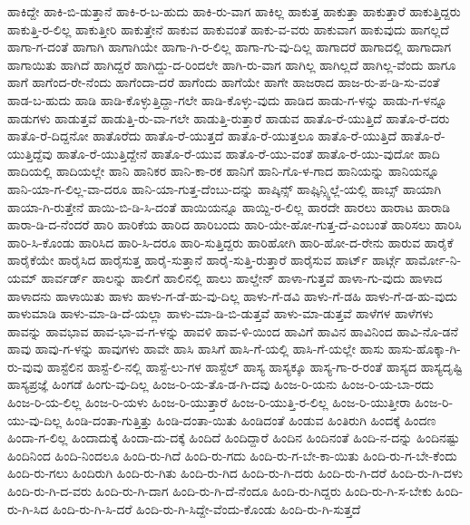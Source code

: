 {ಹಾಕಿದ್ದೇ
ಹಾಕಿ-ಬಿ-ಡುತ್ತಾನೆ
ಹಾಕಿ-ರ-ಬ-ಹುದು
ಹಾಕಿ-ರು-ವಾಗ
ಹಾಕಿಲ್ಲ
ಹಾಕುತ್ತ
ಹಾಕುತ್ತಾ
ಹಾಕುತ್ತಾರೆ
ಹಾಕುತ್ತಿದ್ದರು
ಹಾಕುತ್ತಿ-ರ-ಲಿಲ್ಲ
ಹಾಕುತ್ತೀರಿ
ಹಾಕುತ್ತೇನೆ
ಹಾಕುವ
ಹಾಕುವಂತೆ
ಹಾಕು-ವ-ವರು
ಹಾಕುವಾಗ
ಹಾಕುವುದು
ಹಾಗಲ್ಲದೆ
ಹಾಗಾ-ಗ-ದಂತೆ
ಹಾಗಾಗಿ
ಹಾಗಾಗಿಯೇ
ಹಾಗಾ-ಗಿ-ರ-ಲಿಲ್ಲ
ಹಾಗಾ-ಗು-ವು-ದಿಲ್ಲ
ಹಾಗಾದರೆ
ಹಾಗಾದಲ್ಲಿ
ಹಾಗಾದಾಗ
ಹಾಗಾಯಿತು
ಹಾಗಿದೆ
ಹಾಗಿದ್ದರೆ
ಹಾಗಿದ್ದು-ದ-ರಿಂದಲೇ
ಹಾಗಿ-ರು-ವಾಗ
ಹಾಗಿಲ್ಲ
ಹಾಗಿಲ್ಲದೆ
ಹಾಗಿಲ್ಲ-ವೆಂದು
ಹಾಗೂ
ಹಾಗೆ
ಹಾಗೆಂದ-ರೇ-ನೆಂದು
ಹಾಗೆಂದಾ-ದರೆ
ಹಾಗೆಂದು
ಹಾಗೆಯೇ
ಹಾಗೇ
ಹಾಜರಾದ
ಹಾಜ-ರು-ಪ-ಡಿ-ಸು-ವಂತೆ
ಹಾಡ-ಬ-ಹುದು
ಹಾಡಿ
ಹಾಡಿ-ಕೊಳ್ಳುತ್ತಿದ್ದಾ-ಗಲೇ
ಹಾಡಿ-ಕೊಳ್ಳು-ವುದು
ಹಾಡಿದ
ಹಾಡು-ಗ-ಳನ್ನು
ಹಾಡು-ಗ-ಳನ್ನೂ
ಹಾಡುಗಳು
ಹಾಡುತ್ತವೆ
ಹಾಡುತ್ತಿ-ರು-ವಾ-ಗಲೇ
ಹಾಡುತ್ತಿ-ರುತ್ತಾರೆ
ಹಾಡುವ
ಹಾತೊ-ರೆ-ಯುತ್ತಿದೆ
ಹಾತೊ-ರೆ-ದರು
ಹಾತೊ-ರೆ-ದಿದ್ದನೋ
ಹಾತೊರೆದು
ಹಾತೊ-ರೆ-ಯುತ್ತದೆ
ಹಾತೊ-ರೆ-ಯುತ್ತಲೂ
ಹಾತೊ-ರೆ-ಯುತ್ತಿದೆ
ಹಾತೊ-ರೆ-ಯುತ್ತಿದ್ದೆವು
ಹಾತೊ-ರೆ-ಯುತ್ತಿದ್ದೇನೆ
ಹಾತೊ-ರೆ-ಯುವ
ಹಾತೊ-ರೆ-ಯು-ವಂತೆ
ಹಾತೊ-ರೆ-ಯು-ವುದೋ
ಹಾದಿ
ಹಾದಿಯಲ್ಲಿ
ಹಾದಿಯಲ್ಲೇ
ಹಾನಿ
ಹಾನಿಕರ
ಹಾನಿ-ಕಾ-ರಕ
ಹಾನಿಗೆ
ಹಾನಿ-ಗೊ-ಳ-ಗಾದ
ಹಾನಿಯನ್ನು
ಹಾನಿಯನ್ನೂ
ಹಾನಿ-ಯಾ-ಗ-ಲಿಲ್ಲ-ವಾ-ದರೂ
ಹಾನಿ-ಯಾ-ಗುತ್ತ-ದೆಂಬು-ದನ್ನು
ಹಾಪ್ಕಿನ್ಸ್
ಹಾಫ್ಕಿನ್ಸ್ವಿಲ್ಲೆ-ಯಲ್ಲಿ
ಹಾಬ್ಸ್
ಹಾಯಾಗಿ
ಹಾಯಾ-ಗಿ-ರುತ್ತೇನೆ
ಹಾಯಿ-ಬಿ-ಡಿ-ಸಿ-ದಂತೆ
ಹಾಯಿಯನ್ನೂ
ಹಾಯ್ದಿ-ರ-ಲಿಲ್ಲ
ಹಾರದೇ
ಹಾರಲು
ಹಾರಾಟ
ಹಾರಾಡಿ
ಹಾರಾ-ಡಿ-ದ-ನೆಂದರೆ
ಹಾರಿ
ಹಾರಿಕೆಯ
ಹಾರಿದ
ಹಾರಿಬಂದು
ಹಾರಿ-ಯೇ-ಹೋ-ಗುತ್ತ-ದೆ-ಎಂಬಂತೆ
ಹಾರಿಸಲು
ಹಾರಿಸಿ
ಹಾರಿ-ಸಿ-ಕೊಂಡು
ಹಾರಿಸಿದ
ಹಾರಿ-ಸಿ-ದರೂ
ಹಾರಿ-ಸುತ್ತಿದ್ದರು
ಹಾರಿಹೋಗಿ
ಹಾರಿ-ಹೋ-ದ-ರೇನು
ಹಾರುವ
ಹಾರೈಕೆ
ಹಾರೈಕೆಯೇ
ಹಾರೈಸಿದ
ಹಾರೈಸುತ್ತ
ಹಾರೈ-ಸುತ್ತಾನೆ
ಹಾರೈ-ಸುತ್ತಿ-ರುತ್ತಾರೆ
ಹಾರೈಸುವ
ಹಾರ್ಟ್
ಹಾರ್ಟ್ಗೆ
ಹಾರ್ಮೋ-ನಿ-ಯಮ್
ಹಾರ್ವರ್ಡ್
ಹಾಲನ್ನು
ಹಾಲಿಗೆ
ಹಾಲಿನಲ್ಲಿ
ಹಾಲು
ಹಾಲ್ಡೇನ್
ಹಾಳಾ-ಗುತ್ತವೆ
ಹಾಳಾ-ಗು-ವುದು
ಹಾಳಾದ
ಹಾಳಾದನು
ಹಾಳಾಯಿತು
ಹಾಳು
ಹಾಳು-ಗ-ಡೆ-ಹು-ವು-ದಿಲ್ಲ
ಹಾಳು-ಗೆ-ಡವಿ
ಹಾಳು-ಗೆ-ಡಹಿ
ಹಾಳು-ಗೆ-ಡ-ಹು-ವುದು
ಹಾಳುಮಾಡಿ
ಹಾಳು-ಮಾ-ಡಿ-ದೆ-ಯಲ್ಲಾ
ಹಾಳು-ಮಾ-ಡಿ-ಬಿ-ಡುತ್ತವೆ
ಹಾಳು-ಮಾ-ಡುತ್ತವೆ
ಹಾಳೆಗಳ
ಹಾಳೆಗಳು
ಹಾವನ್ನು
ಹಾವಭಾವ
ಹಾವ-ಭಾ-ವ-ಗ-ಳನ್ನು
ಹಾವಳಿ
ಹಾವ-ಳಿ-ಯಿಂದ
ಹಾವಿಗೆ
ಹಾವಿನ
ಹಾವಿನಿಂದ
ಹಾವಿ-ನೊ-ಡನೆ
ಹಾವು
ಹಾವು-ಗ-ಳನ್ನು
ಹಾವುಗಳು
ಹಾವೇ
ಹಾಸಿ
ಹಾಸಿಗೆ
ಹಾಸಿ-ಗೆ-ಯಲ್ಲಿ
ಹಾಸಿ-ಗೆ-ಯಲ್ಲೇ
ಹಾಸು
ಹಾಸು-ಹೊಕ್ಕಾ-ಗಿ-ರು-ವುವು
ಹಾಸ್ಟೆಲಿನ
ಹಾಸ್ಟೆ-ಲಿ-ನಲ್ಲಿ
ಹಾಸ್ಟೆ-ಲು-ಗಳ
ಹಾಸ್ಟೆಲ್
ಹಾಸ್ಯ
ಹಾಸ್ಯಕ್ಕೂ
ಹಾಸ್ಯ-ಗಾ-ರ-ರಂತೆ
ಹಾಸ್ಯದ
ಹಾಸ್ಯದೃಷ್ಟಿ
ಹಾಸ್ಯಪ್ರಜ್ಞೆ
ಹಿಂಗಡೆ
ಹಿಂಗು-ವು-ದಿಲ್ಲ
ಹಿಂಜ-ರಿ-ಯ-ತೊ-ಡ-ಗಿ-ದವು
ಹಿಂಜ-ರಿ-ಯನು
ಹಿಂಜ-ರಿ-ಯ-ಬಾ-ರದು
ಹಿಂಜ-ರಿ-ಯ-ಲಿಲ್ಲ
ಹಿಂಜ-ರಿ-ಯಳು
ಹಿಂಜ-ರಿ-ಯುತ್ತಾರೆ
ಹಿಂಜ-ರಿ-ಯುತ್ತಿ-ರ-ಲಿಲ್ಲ
ಹಿಂಜ-ರಿ-ಯುತ್ತೀರಾ
ಹಿಂಜ-ರಿ-ಯು-ವು-ದಿಲ್ಲ
ಹಿಂಡಿ-ದಂತಾ-ಗುತ್ತಿತ್ತು
ಹಿಂಡಿ-ದಂತಾ-ಯಿತು
ಹಿಂಡಿದಂತೆ
ಹಿಂಡುವ
ಹಿಂತಿರುಗಿ
ಹಿಂದಕ್ಕೆ
ಹಿಂದಣ
ಹಿಂದಾ-ಗ-ಲಿಲ್ಲ
ಹಿಂದಾದುಕ್ಕೆ
ಹಿಂದಾ-ದು-ದಕ್ಕೆ
ಹಿಂದಿದೆ
ಹಿಂದಿದ್ದಾರೆ
ಹಿಂದಿನ
ಹಿಂದಿನಂತೆ
ಹಿಂದಿ-ನ-ದನ್ನು
ಹಿಂದಿನಷ್ಟು
ಹಿಂದಿನಿಂದ
ಹಿಂದಿ-ನಿಂದಲೂ
ಹಿಂದಿ-ರು-ಗಿದೆ
ಹಿಂದಿ-ರು-ಗದು
ಹಿಂದಿ-ರು-ಗ-ಬೇ-ಕಾ-ಯಿತು
ಹಿಂದಿ-ರು-ಗ-ಬೇ-ಕೆಂದು
ಹಿಂದಿ-ರು-ಗಲು
ಹಿಂದಿರುಗಿ
ಹಿಂದಿ-ರು-ಗಿತು
ಹಿಂದಿ-ರು-ಗಿದ
ಹಿಂದಿ-ರು-ಗಿ-ದರು
ಹಿಂದಿ-ರು-ಗಿ-ದರೆ
ಹಿಂದಿ-ರು-ಗಿ-ದಳು
ಹಿಂದಿ-ರು-ಗಿ-ದ-ವರು
ಹಿಂದಿ-ರು-ಗಿ-ದಾಗ
ಹಿಂದಿ-ರು-ಗಿ-ದೆ-ನೆಂದೂ
ಹಿಂದಿ-ರು-ಗಿದ್ದರು
ಹಿಂದಿ-ರು-ಗಿ-ಸ-ಬೇಕು
ಹಿಂದಿ-ರು-ಗಿ-ಸಿದ
ಹಿಂದಿ-ರು-ಗಿ-ಸಿ-ದರೆ
ಹಿಂದಿ-ರು-ಗಿ-ಸಿದ್ದೇ-ವೆಂದು-ಕೊಂಡು
ಹಿಂದಿ-ರು-ಗಿ-ಸುತ್ತದೆ
}
